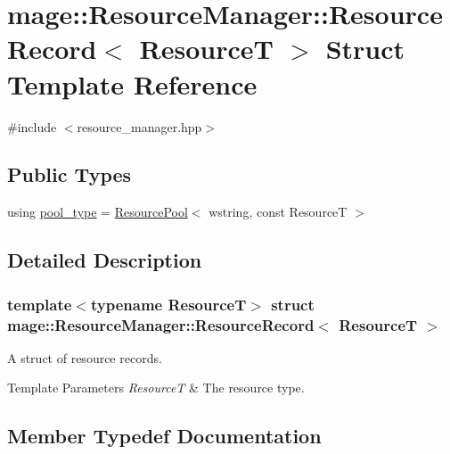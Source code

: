 \hypertarget{structmage_1_1_resource_manager_1_1_resource_record}{}\section{mage\+:\+:Resource\+Manager\+:\+:Resource\+Record$<$ ResourceT $>$ Struct Template Reference}
\label{structmage_1_1_resource_manager_1_1_resource_record}


{\ttfamily \#include $<$resource\+\_\+manager.\+hpp$>$}

\subsection*{Public Types}
\begin{DoxyCompactItemize}
\item 
using \hyperlink{structmage_1_1_resource_manager_1_1_resource_record_a195d1199a060292958718d215dbce748}{pool\+\_\+type} = \hyperlink{classmage_1_1_resource_pool}{Resource\+Pool}$<$ wstring, const ResourceT $>$
\end{DoxyCompactItemize}


\subsection{Detailed Description}
\subsubsection*{template$<$typename ResourceT$>$\newline
struct mage\+::\+Resource\+Manager\+::\+Resource\+Record$<$ Resource\+T $>$}

A struct of resource records.


\begin{DoxyTemplParams}{Template Parameters}
{\em ResourceT} & The resource type. \\
\hline
\end{DoxyTemplParams}


\subsection{Member Typedef Documentation}
\hypertarget{structmage_1_1_resource_manager_1_1_resource_record_a195d1199a060292958718d215dbce748}{}\label{structmage_1_1_resource_manager_1_1_resource_record_a195d1199a060292958718d215dbce748} 
